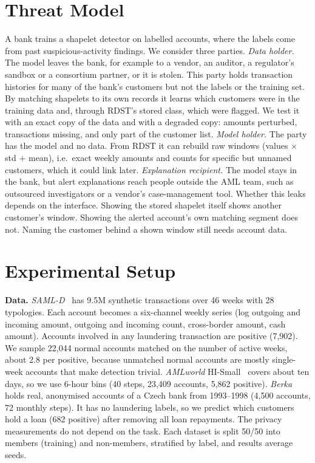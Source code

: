\documentclass[sigconf,anonymous]{acmart}
\begin{document}
\section{Threat Model}
A bank trains a shapelet detector on labelled accounts, where the labels come from past suspicious-activity findings. We consider three parties.
\emph{Data holder.} The model leaves the bank, for example to a vendor, an auditor, a regulator's sandbox or a consortium partner, or it is stolen. This party holds transaction histories for many of the bank's customers but not the labels or the training set. By matching shapelets to its own records it learns which customers were in the training data and, through RDST's stored class, which were flagged. We test it with an exact copy of the data and with a degraded copy: amounts perturbed, transactions missing, and only part of the customer list.
\emph{Model holder.} The party has the model and no data. From RDST it can rebuild raw windows (values $\times$ std $+$ mean), i.e.\ exact weekly amounts and counts for specific but unnamed customers, which it could link later.
\emph{Explanation recipient.} The model stays in the bank, but alert explanations reach people outside the AML team, such as outsourced investigators or a vendor's case-management tool. Whether this leaks depends on the interface. Showing the stored shapelet itself shows another customer's window. Showing the alerted account's own matching segment does not. Naming the customer behind a shown window still needs account data.

\section{Experimental Setup}
\textbf{Data.} \emph{SAML-D}~\cite{samld} has 9.5M synthetic transactions over 46 weeks with 28 typologies. Each account becomes a six-channel weekly series (log outgoing and incoming amount, outgoing and incoming count, cross-border amount, cash amount). Accounts involved in any laundering transaction are positive (7,902). We sample 22,044 normal accounts matched on the number of active weeks, about 2.8 per positive, because unmatched normal accounts are mostly single-week accounts that make detection trivial. \emph{AMLworld} HI-Small~\cite{amlworld} covers about ten days, so we use 6-hour bins (40 steps, 23,409 accounts, 5,862 positive). \emph{Berka}~\cite{berka} holds real, anonymised accounts of a Czech bank from 1993--1998 (4,500 accounts, 72 monthly steps). It has no laundering labels, so we predict which customers hold a loan (682 positive) after removing all loan repayments. The privacy measurements do not depend on the task. Each dataset is split 50/50 into members (training) and non-members, stratified by label, and results average \nSeeds{} seeds.
\end{document}
